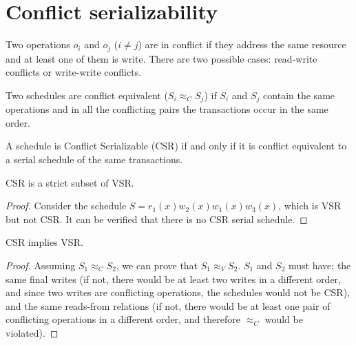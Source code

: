 \section{Conflict serializability}

\begin{definition}
    Two operations $o_i$ and $o_j$ ($i \neq j$) are in conflict if they address the same resource and at least one of them is write. 
    There are two possible cases: read-write conflicts or write-write conflicts.
\end{definition}
\begin{definition}
    Two schedules are conflict equivalent ($S_i \approx_C S_j$) if $S_i$ and $S_j$ contain the same operations and in all the conflicting pairs the transactions occur in the same order. 
\end{definition}    
\begin{definition}
    A schedule is Conflict Serializable (CSR) if and only if it is conflict equivalent to a serial schedule of the same transactions. 
\end{definition}
\begin{property}
    CSR is a strict subset of VSR. 
\end{property}
\begin{proof}
    Consider the schedule $S = r_1(x) w_2(x) w_1(x) w_3(x)$, which is VSR but not CSR. 
    It can be verified that there is no CSR serial schedule.
\end{proof}
\begin{property}
    CSR implies VSR.
\end{property}
\begin{proof}
    Assuming $S_1 \approx_C S_2$, we can prove that $S_1 \approx_V S_2$. 
    $S_1$ and $S_2$ must have: the same final writes (if not, there would be at least two writes in a different order, and since two writes are conflicting operations, the schedules would not be CSR), and the same reads-from relations (if not, there would be at least one pair of conflicting operations in a different order, and therefore $\approx_C$ would be violated).
\end{proof}

